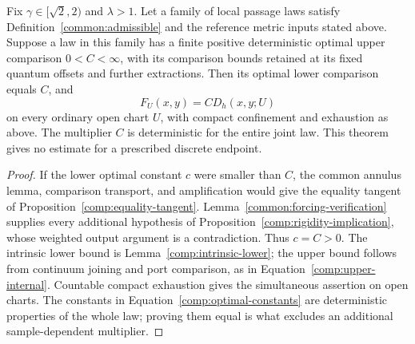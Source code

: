 \begin{theorem}
\label{common:identification}
Fix $\gamma\in[\sqrt2,2)$ and $\lambda>1$.  Let a family of local
passage laws satisfy Definition~\ref{common:admissible} and the
reference metric inputs stated above.  Suppose a law in this family
has a finite positive deterministic optimal upper comparison
$0<C<\infty$, with its comparison bounds retained at its fixed
quantum offsets and further extractions.  Then its optimal lower
comparison equals $C$, and
\[
 F_U(x,y)=C D_h(x,y;U)
\]
on every ordinary open chart $U$, with compact confinement and
exhaustion as above.  The multiplier $C$ is deterministic for the
entire joint law.  This theorem gives no estimate for a prescribed
discrete endpoint.
\end{theorem}
\begin{proof}
If the lower optimal constant $c$ were smaller than $C$, the common
annulus lemma, comparison transport, and amplification would give the
equality tangent of Proposition~\ref{comp:equality-tangent}.
Lemma~\ref{common:forcing-verification} supplies every additional
hypothesis of Proposition~\ref{comp:rigidity-implication}, whose
weighted output argument is a contradiction.  Thus $c=C>0$.
The intrinsic lower bound is Lemma~\ref{comp:intrinsic-lower}; the
upper bound follows from continuum joining and port comparison,
as in Equation~\eqref{comp:upper-internal}.  Countable compact
exhaustion gives the simultaneous assertion on open charts.
The constants in Equation~\eqref{comp:optimal-constants} are
deterministic properties of the whole law; proving them equal is
what excludes an additional sample-dependent multiplier.
\end{proof}
